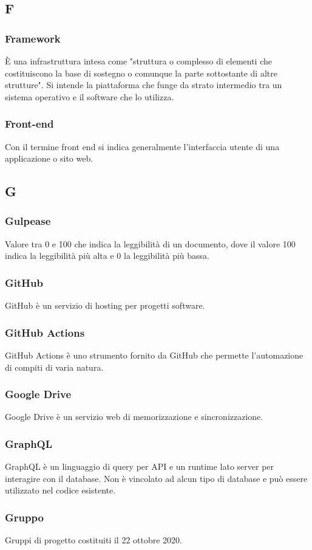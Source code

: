 \subsection*{F}
\subsubsection*{Framework} È una infrastruttura intesa come "struttura o complesso di elementi che costituiscono la base di sostegno o comunque la parte sottostante di altre strutture". Si intende la piattaforma che funge da strato intermedio tra un sistema operativo e il software che lo utilizza.
\subsubsection*{Front-end} Con il termine front end si indica generalmente l’interfaccia utente di una applicazione o sito web.
\subsection*{G}
\subsubsection*{Gulpease} Valore tra 0 e 100 che indica la leggibilità di un documento, dove il valore 100 indica la leggibilità più alta e 0 la leggibilità più bassa. 
\subsubsection*{GitHub} GitHub è un servizio di hosting per progetti software.
\subsubsection*{GitHub Actions} GitHub Actions è uno strumento fornito da GitHub che permette l’automazione di compiti di varia natura.
\subsubsection*{Google Drive} Google Drive è un servizio web di memorizzazione e sincronizzazione.
\subsubsection*{GraphQL} GraphQL è un linguaggio di query per API e un runtime lato server per interagire con il database. Non è vincolato ad alcun tipo di database e può essere utilizzato nel codice esistente.
\subsubsection*{Gruppo} Gruppi di progetto costituiti il 22 ottobre 2020.
